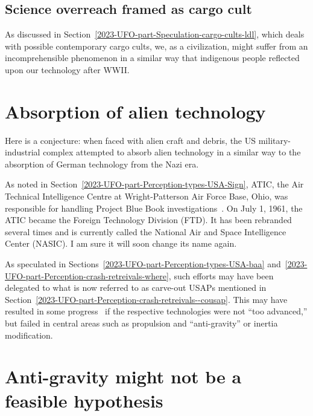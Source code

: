 \subsection{Science overreach framed as cargo cult}

As discussed in Section~\ref{2023-UFO-part-Speculation-cargo-cults-ldl}, which deals with possible contemporary cargo cults,
we, as a civilization, might suffer from an incomprehensible phenomenon in a similar way that indigenous people reflected upon our technology after WWII.



\section{Absorption of alien technology}
\label{2023-UFO-part-Perception-flight-characteristics-aat}



Here is a conjecture: when faced with alien craft and debris, the US military-industrial complex attempted to absorb alien technology in a similar way to the absorption of German technology from the Nazi era.

As noted in Section~\ref{2023-UFO-part-Perception-types-USA-Sign},
ATIC, the Air Technical Intelligence Centre at Wright-Patterson Air Force Base, Ohio, was responsible for handling Project Blue Book investigations~\cite[Chapter~3]{Ruppelt2011May}.
On July 1, 1961, the ATIC became the Foreign Technology Division (FTD).
It has been rebranded several times and is currently called the National Air and Space Intelligence Center (NASIC). I am sure it will soon change its name again.

As speculated in Sections~\ref{2023-UFO-part-Perception-types-USA-baa}
and~\ref{2023-UFO-part-Perception-crash-retreivals-where},
such efforts may have been delegated to what is now referred to as carve-out USAPs mentioned in Section~\ref{2023-UFO-part-Perception-crash-retreivals--cousap}.
This may have resulted in some progress~\cite{Corso1998Jun} if the respective technologies were not ``too advanced,'' but failed in central areas such as propulsion and ``anti-gravity'' or inertia modification.


\section{Anti-gravity might not be a feasible hypothesis}
\label{2023-UFO-part-Perception-flight-characteristics-ag}

